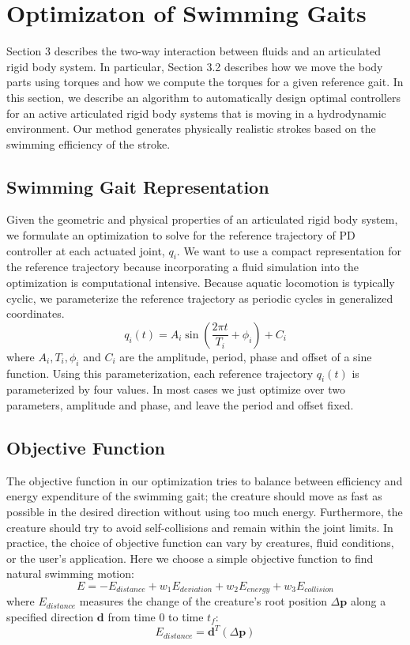 \section{Optimizaton of Swimming Gaits}
\label{sec:optimization}

Section 3 describes the two-way interaction between fluids and an articulated rigid body system. In particular, Section 3.2 describes how we move the body parts using torques and how we compute the torques for a given reference gait. In this section, we describe an algorithm to automatically design optimal controllers for an active articulated
rigid body systems that is moving in a hydrodynamic environment.  Our
method generates physically realistic strokes based on the swimming
efficiency of the stroke.

\subsection{Swimming Gait Representation}

Given the geometric and physical properties of an articulated rigid body
system, we formulate an optimization to solve for the reference trajectory
of PD controller at each actuated joint, $q_i$.  We want to use a
compact representation for the reference trajectory because
incorporating a fluid simulation into the optimization is computational
intensive. Because aquatic locomotion is typically cyclic, we parameterize
the reference trajectory as periodic cycles in generalized coordinates.
\begin{displaymath}
q_i(t)=A_i\sin(\frac{2\pi t}{T_i}+\phi_i)+C_i
\end{displaymath}
where $A_i, T_i, \phi_i$ and $C_i$ are the amplitude, period, phase and
offset of a sine function. Using this parameterization, each reference
trajectory $q_i(t)$ is parameterized by four values.  In most cases we
just optimize over two parameters, amplitude and phase, and leave the
period and offset fixed.

\subsection{Objective Function}

The objective function in our optimization tries to balance between
efficiency and energy expenditure of the swimming gait; the creature
should move as fast as possible in the desired direction without using too
much energy. Furthermore, the creature should try to avoid self-collisions
and remain within the joint limits. In practice, the choice of objective
function can vary by creatures, fluid conditions, or the user's
application. Here we choose a simple objective function to find natural
swimming motion:
\begin{equation}
\label{eq:objFunc}
E=-E_{distance}+w_1E_{deviation}+w_2E_{energy}+w_3E_{collision}
\end{equation}
where $E_{distance}$ measures the change of the creature's root position $\Delta\mathbf{p}$ along a specified direction $\mathbf{d}$ from time 0 to time $t_f$:
\begin{displaymath}
E_{distance}=\mathbf{d}^T(\Delta\mathbf{p})
\end{displaymath}

